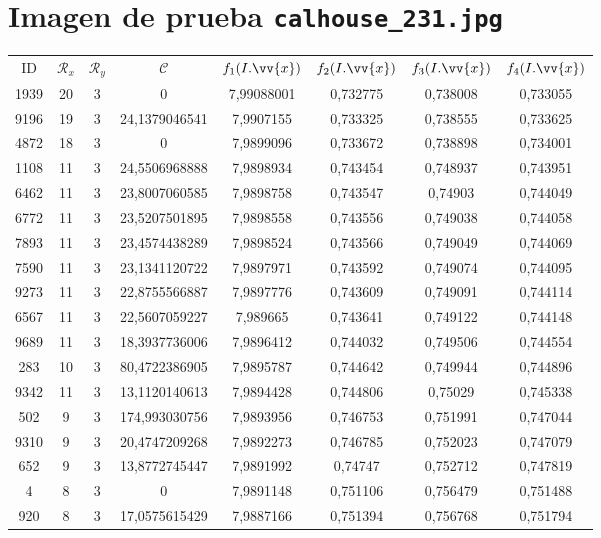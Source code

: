 \section{Imagen de prueba \texttt{calhouse\_231.jpg}}

\scriptsize
\begin{longtable}{|c|c|c|c|c|c|c|c|}
\hline
ID & $\mathscr{R}_x$ & $\mathscr{R}_y$ & $\mathscr{C}$ & $f_1(I.\vv{x})$ & $f_2(I.\vv{x})$ & $f_3(I.\vv{x})$ & $f_4(I.\vv{x})$ \\
1939 & 20 & 3 & 0 & 7,99088001 & 0,732775 & 0,738008 & 0,733055 \\
9196 & 19 & 3 & 24,1379046541 & 7,9907155 & 0,733325 & 0,738555 & 0,733625 \\
4872 & 18 & 3 & 0 & 7,9899096 & 0,733672 & 0,738898 & 0,734001 \\
1108 & 11 & 3 & 24,5506968888 & 7,9898934 & 0,743454 & 0,748937 & 0,743951 \\
6462 & 11 & 3 & 23,8007060585 & 7,9898758 & 0,743547 & 0,74903 & 0,744049 \\
6772 & 11 & 3 & 23,5207501895 & 7,9898558 & 0,743556 & 0,749038 & 0,744058 \\
7893 & 11 & 3 & 23,4574438289 & 7,9898524 & 0,743566 & 0,749049 & 0,744069 \\
7590 & 11 & 3 & 23,1341120722 & 7,9897971 & 0,743592 & 0,749074 & 0,744095 \\
9273 & 11 & 3 & 22,8755566887 & 7,9897776 & 0,743609 & 0,749091 & 0,744114 \\
6567 & 11 & 3 & 22,5607059227 & 7,989665 & 0,743641 & 0,749122 & 0,744148 \\
9689 & 11 & 3 & 18,3937736006 & 7,9896412 & 0,744032 & 0,749506 & 0,744554 \\
283 & 10 & 3 & 80,4722386905 & 7,9895787 & 0,744642 & 0,749944 & 0,744896 \\
9342 & 11 & 3 & 13,1120140613 & 7,9894428 & 0,744806 & 0,75029 & 0,745338 \\
502 & 9 & 3 & 174,993030756 & 7,9893956 & 0,746753 & 0,751991 & 0,747044 \\
9310 & 9 & 3 & 20,4747209268 & 7,9892273 & 0,746785 & 0,752023 & 0,747079 \\
652 & 9 & 3 & 13,8772745447 & 7,9891992 & 0,74747 & 0,752712 & 0,747819 \\
4 & 8 & 3 & 0 & 7,9891148 & 0,751106 & 0,756479 & 0,751488 \\
920 & 8 & 3 & 17,0575615429 & 7,9887166 & 0,751394 & 0,756768 & 0,751794 \\

\end{longtable}
